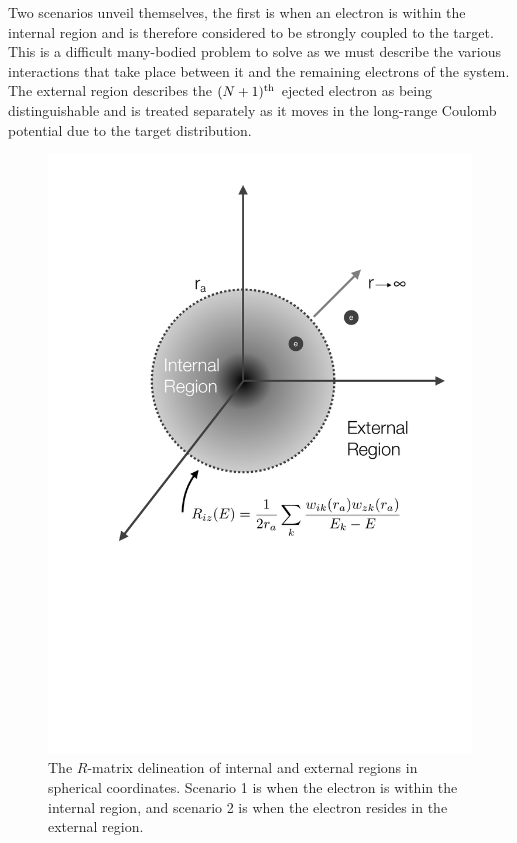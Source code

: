 Two scenarios unveil themselves, the first is when an electron is within the internal region and is therefore considered to be strongly coupled to the target. This is a difficult many-bodied problem to solve as we must describe the various interactions that take place between it and the remaining electrons of the system. The external region describes the $(N+1)^{\rm th}$ ejected electron as being distinguishable and is treated separately as it moves in the long-range Coulomb potential due to the target distribution.

\begin{figure}[hbt]
\centering
\includegraphics[scale=0.55]{Figures/r-matrix/int-ext.pdf}
\caption{The $R$-matrix delineation of internal and external regions in spherical coordinates. Scenario 1 is when the electron is within the internal region, and scenario 2 is when the electron resides in the external region. \label{fig:rmat_sphere}}
\end{figure}

